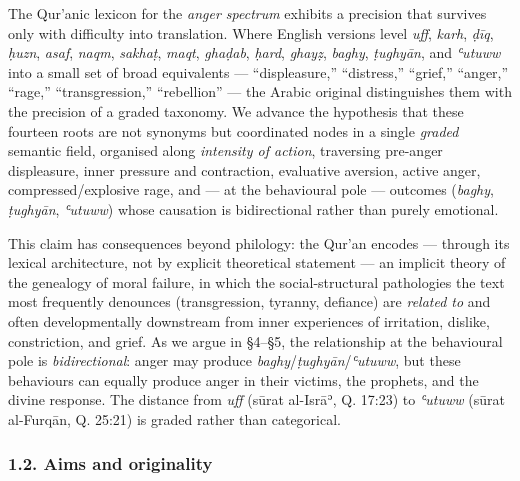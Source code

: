 The Qur'anic lexicon for the \emph{anger spectrum} exhibits a precision
that survives only with difficulty into translation. Where English
versions level \emph{uff}, \emph{karh}, \emph{ḍīq}, \emph{ḥuzn},
\emph{asaf}, \emph{naqm}, \emph{sakhaṭ}, \emph{maqt}, \emph{ghaḍab},
\emph{ḥard}, \emph{ghayẓ}, \emph{baghy}, \emph{ṭughyān}, and
\emph{ʿutuww} into a small set of broad equivalents --- ``displeasure,''
``distress,'' ``grief,'' ``anger,'' ``rage,'' ``transgression,''
``rebellion'' --- the Arabic original distinguishes them with the
precision of a graded taxonomy. We advance the hypothesis that these
fourteen roots are not synonyms but coordinated nodes in a single
\emph{graded} semantic field, organised along \emph{intensity of
action}, traversing pre-anger displeasure, inner pressure and
contraction, evaluative aversion, active anger, compressed/explosive
rage, and --- at the behavioural pole --- outcomes (\emph{baghy},
\emph{ṭughyān}, \emph{ʿutuww}) whose causation is bidirectional rather
than purely emotional.

This claim has consequences beyond philology: the Qur'an encodes ---
through its lexical architecture, not by explicit theoretical statement
--- an implicit theory of the genealogy of moral failure, in which the
social-structural pathologies the text most frequently denounces
(transgression, tyranny, defiance) are \emph{related to} and often
developmentally downstream from inner experiences of irritation,
dislike, constriction, and grief. As we argue in §4--§5, the
relationship at the behavioural pole is \emph{bidirectional}: anger may
produce \emph{baghy}/\emph{ṭughyān}/\emph{ʿutuww}, but these behaviours
can equally produce anger in their victims, the prophets, and the divine
response. The distance from \emph{uff} (sūrat al-Isrāʾ, Q. 17:23) to
\emph{ʿutuww} (sūrat al-Furqān, Q. 25:21) is graded rather than
categorical.

\subsubsection{1.2. Aims and originality}\label{aims-and-originality}


